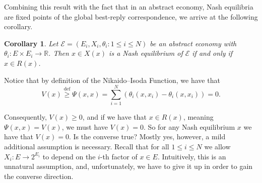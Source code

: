 \documentclass[a4paper,11pt,reqno,english]{amsart}
\newtheorem{corollary}[theorem]{Corollary}
\theoremstyle{definition}
\begin{document}
Combining this result with the fact that in an abstract economy, Nash equilibria are fixed points of the global best-reply correspondence, we arrive at the following corollary.

\begin{corollary}\label{cor:FixedPointNIBestReplyCorrespondence}
	Let $\mathcal{E}=(E_i,X_i,\theta_i\colon 1\leq i\leq N)$ be an abstract economy with $\theta_i\colon E\times E_i\longrightarrow\mathbb{R}$. Then $x\in X(x)$ is a Nash equilibrium of $\mathcal{E}$ if and only if $x\in R(x)$.
\end{corollary}

Notice that by definition of the Nikaido--Isoda Function, we have that
\begin{displaymath}
	V(x) \overset{\text{def}}{\geq}\Psi(x,x) = \sum_{i=1}^{N}\left(\theta_i(x,x_i) - \theta_i(x,x_i)\right) = 0.
\end{displaymath}

Consequently, $V(x)\geq 0$, and if we have that $x\in R(x)$, meaning $\Psi(x,x) = V(x)$, we must have $V(x) = 0$. So for any Nash equilibrium $x$ we have that $V(x) = 0$. Is the converse true? Mostly yes, however, a mild additional assumption is necessary. Recall that for all $1\leq i \leq N$ we allow $X_i\colon E\longrightarrow 2^{E_i}$ to depend on the $i$-th factor of $x\in E$. Intuitively, this is an unnatural assumption, and, unfortunately, we have to give it up in order to gain the converse direction.
\end{document}
